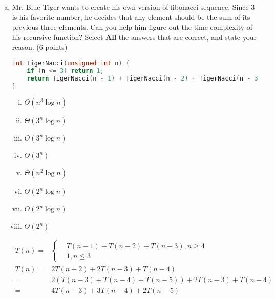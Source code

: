 \documentclass[11pt]{exam}
\begin{document}
\begin{enumerate}[(a)]
    \item Mr. Blue Tiger wants to create his own version of fibonacci sequence. Since 3 is his favorite number, he decides that any element should be the sum of its previous three elements. Can you help him figure out the time complexity of his recursive function? Select \textbf{All} the answers that are correct, and state your reason. (6 points)
          \begin{lstlisting}[language=c++]
int TigerNacci(unsigned int n) {
	if (n <= 3) return 1;
	return TigerNacci(n - 1) + TigerNacci(n - 2) + TigerNacci(n - 3);
}
\end{lstlisting}
          \begin{enumerate}[i)]
              \item $\Theta(n^{3}\log n)$
              \item $\Theta(3^{n}\log n)$
              \item $O(3^{n}\log n)$
              \item $\Theta(3^{n})$
              \item $\Theta(n^{2}\log n)$
              \item $\Theta(2^{n}\log n)$
              \item $O(2^{n}\log n)$
              \item $\Theta(2^{n})$
          \end{enumerate}
          \begin{solution}
              \begin{align*}
                  T(n)=                 & \begin{cases}   & T(n-1)+T(n-2)+T(n-3), n \geq 4 \\
                & 1 ,n \leq 3
                                          \end{cases}              \\
                  T(n) =                & 2T(n-2)+2T(n-3)+T(n-4)                                        \\ =&
                  2(T(n-3)+T(n-4)+T(n-5))+2T(n-3)+T(n-4)                                                \\=&
                  4T(n-3)+3T(n-4)+2T(n-5)                                                               \\

\end{align*}
\end{solution}
\end{enumerate}
\end{document}
